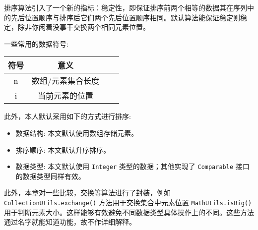 排序算法引入了一个新的指标：稳定性，即保证排序前两个相等的数据其在序列中的先后位置顺序与排序后它们两个先后位置顺序相同。默认算法能保证稳定则稳定，除非你闲着没事干交换两个相同元素位置。

一些常用的数据符号:

\begin{table}[H]
    \centering
    \setlength{\tabcolsep}{4mm}
    \begin{tabular}{c|ccc}
        \toprule
        \textbf{符号} & \textbf{意义} \\
        \midrule
        n & 数组/元素集合长度 \\
        i & 当前元素的位置 \\
        \bottomrule
    \end{tabular}
\end{table}

此外，本人默认采用如下的方式进行排序:
\begin{itemize}
    \item 数据结构: 本文默认使用数组存储元素。
    \item 排序顺序: 本文默认升序排序。
    \item 数据类型: 本文默认使用 \texttt{Integer} 类型的数据；其他实现了 \texttt{Comparable} 接口的数据类型同样有效。
\end{itemize}

此外，本章对一些比较，交换等算法进行了封装，例如 \texttt{CollectionUtils.exchange()} 方法用于交换集合中元素位置 \texttt{MathUtils.isBig()} 用于判断元素大小。这样能够有效避免不同数据类型具体操作上的不同。这些方法通过名字就能知道功能，故不作详细解释。